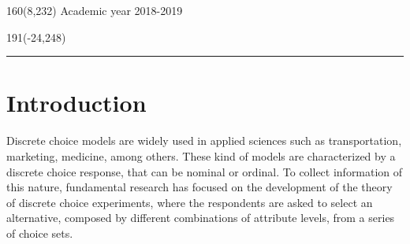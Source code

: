\documentclass[12pt,a4paper,oneside]{article}
\begin{document}
%
%
\begin{textblock}{160}(8,232)
\textblockcolour{}
\vspace{-\parskip}
\flushright
Academic year 2018-2019
\end{textblock}
%
\begin{textblock}{191}(-24,248)
{\color{blueline}\rule{550pt}{5.5pt}}
\end{textblock}
%
\vfill
\newpage




\tableofcontents

\newpage 


\setcounter{page}{0}
\section{Introduction}
Discrete choice models are widely used in applied sciences such as transportation, marketing, medicine, among others. These kind of models are characterized by a discrete choice response, that can be nominal or ordinal. To collect information of this nature, fundamental research has focused on the development of the theory of discrete choice experiments, where the respondents are asked to select an alternative, composed by different combinations of attribute levels, from a series of choice sets.\\
\end{document}
